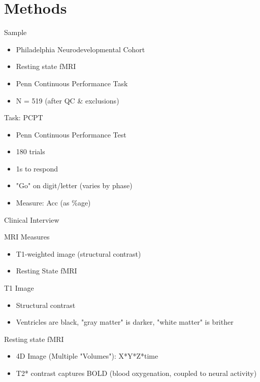 \documentclass[presentation]{beamer}
\begin{document}
\section{Methods}
\label{sec:orgheadline17}
\begin{frame}[label={sec:orgheadline4}]{Sample}
\begin{itemize}
\item Philadelphia Neurodevelopmental Cohort
\item Resting state fMRI
\item Penn Continuous Performance Task
\item N = 519 (after QC \& exclusions)
\end{itemize}
\end{frame}
\begin{frame}[label={sec:orgheadline5}]{Task: PCPT}
\begin{itemize}
\item Penn Continuous Performance Test
\item 180 trials
\item 1s to respond
\item "Go" on digit/letter (varies by phase)
\item Measure: Acc (as \%age)
\end{itemize}
\end{frame}
\begin{frame}[label={sec:orgheadline6}]{Clinical Interview}
\end{frame}
\begin{frame}[label={sec:orgheadline7}]{MRI Measures}
\begin{itemize}
\item T1-weighted image (structural contrast)
\item Resting State fMRI
\end{itemize}
\begin{block}{T1 Image}
\begin{itemize}
\item Structural contrast
\item Ventricles are black, "gray matter" is darker, "white matter" is brither
\end{itemize}
\end{block}
\begin{block}{Resting state fMRI}
\begin{itemize}
\item 4D Image (Multiple "Volumes"): X*Y*Z*time
\item T2* contrast captures BOLD (blood oxygenation, coupled to neural activity)
\end{itemize}
\end{block}
\end{frame}
\end{document}
